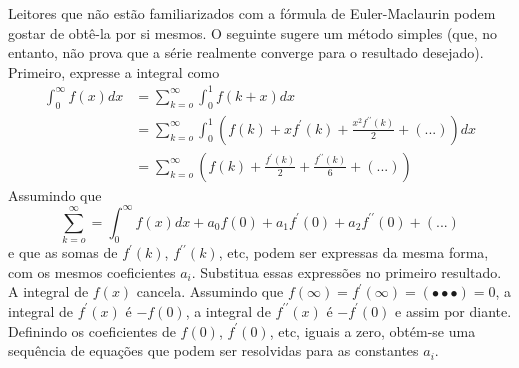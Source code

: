 \documentclass[12pt]{article}
\begin{document}
Leitores que não estão familiarizados com a fórmula de Euler-Maclaurin podem gostar de obtê-la por si mesmos. O seguinte sugere um método simples (que, no entanto, não prova que a série realmente converge para o resultado desejado). Primeiro, expresse a integral como
\begin{align}
\int^{\infty}_{0} f(x) dx &= \sum_{k=o}^{\infty} \int_{0}^{1} f(k+x)dx \\
&= \sum_{k=o}^{\infty} \int_{0}^{1} \left(f(k) + x{f^{\prime}}(k)+\frac{x^{2}{f^{\prime \prime}}(k)}{2} + (...)\right)dx \\
&= \sum_{k=o}^{\infty} \left(f(k) + 
\frac{f^{\prime}(k)}{2}+\frac{{f^{\prime \prime}}(k)}{6} + (...) \right)
\end{align}
Assumindo que
\begin{equation}
    \sum_{k=o}^{\infty} = \int_{0}^{\infty} f(x)dx + a_{0}f(0) + a_{1}{f^{\prime}}(0) + a_{2}{f^{\prime \prime}}(0) + (. . .)
\end{equation}
e que as somas de ${f^{\prime}}(k)$, ${f^{\prime \prime}}(k)$, etc, podem ser expressas da mesma forma, com os mesmos coeficientes $a_{i}$. Substitua essas expressões no primeiro resultado. A integral de $f(x)$ cancela. Assumindo que $f(\infty) = {f^{\prime}}(\infty) = (• • •) = 0$, a integral de ${f^{\prime}}(x)$ é $-f(0)$, a integral de ${f^{\prime \prime}}(x)$ é $-{f^{\prime}}(0)$ e assim por diante. Definindo os coeficientes de $f(0)$, ${f^{\prime}}(0)$, etc, iguais a zero, obtém-se uma sequência de equações que podem ser resolvidas para as constantes $a_{i}$.
\end{document}
